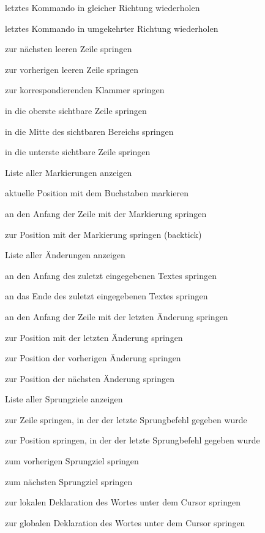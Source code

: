 \documentclass
[
  draft    = true,
  fontsize = 11pt,
  parskip  = half,
  BCOR     = 0pt,
  DIV      = calc,
  ngerman
]
{scrartcl}
\begin{document}
\begin{mytemize}
  \item \vimcmd{}{;}{}          letztes \vimkey{[fFtT]} Kommando in gleicher Richtung wiederholen
  \item \vimcmd{}{,}{}          letztes \vimkey{[fFtT]} Kommando in umgekehrter Richtung wiederholen
  \item \vimcmd{}{\}}{}         zur nächsten leeren Zeile springen
  \item \vimcmd{}{\{}{}         zur vorherigen leeren Zeile springen
  \item \vimcmd{}{\%}{}         zur korrespondierenden Klammer springen
  \item {}        in die oberste sichtbare Zeile springen
  \item {}        in die Mitte des sichtbaren Bereichs springen
  \item {}        in die unterste sichtbare Zeile springen
  \item {}     Liste aller Markierungen anzeigen
  \item {}         aktuelle Position mit dem Buchstaben  markieren
  \item {}         an den Anfang der Zeile mit der Markierung  springen
  \item {}      zur Position mit der Markierung  springen (backtick)
  \item {}   Liste aller Änderungen anzeigen
  \item \vimcmd{}{\`{}[}{}      an den Anfang des zuletzt eingegebenen Textes springen
  \item \vimcmd{}{\`{}]}{}      an das Ende des zuletzt eingegebenen Textes springen
  \item {}         an den Anfang der Zeile mit der letzten Änderung springen
  \item {}      zur Position mit der letzten Änderung springen
  \item {}         zur Position der vorherigen Änderung springen
  \item {}         zur Position der nächsten Änderung springen
  \item {}     Liste aller Sprungziele anzeigen
  \item {}       zur Zeile springen, in der der letzte Sprungbefehl gegeben wurde
  \item \vimcmd{}{\`{}\,\`{}}{} zur Position springen, in der der letzte Sprungbefehl gegeben wurde
  \item {}        zum vorherigen Sprungziel springen
  \item {}        zum nächsten Sprungziel springen
  \item {}         zur lokalen Deklaration des Wortes unter dem Cursor springen
  \item {}         zur globalen Deklaration des Wortes unter dem Cursor springen
\end{mytemize}
\end{document}
